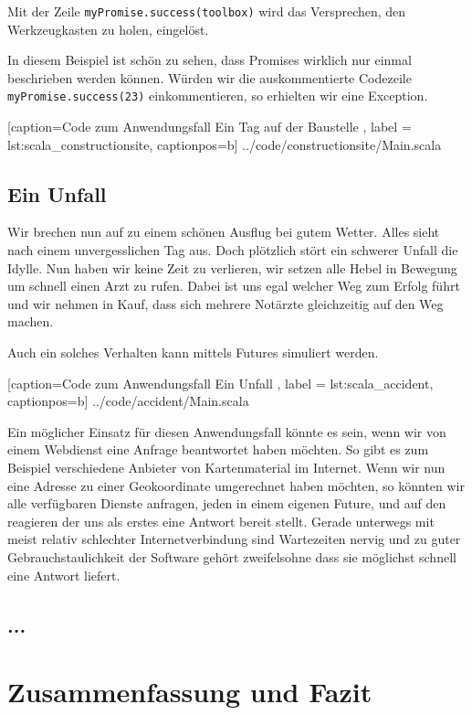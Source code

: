 \documentclass[11pt,a4paper,titlepage,ngerman]{scrartcl}
\begin{document}
Mit der Zeile \texttt{myPromise.success(toolbox)} wird das Versprechen,
den Werkzeugkasten zu holen, eingelöst.

In diesem Beispiel ist schön zu sehen, dass Promises wirklich nur einmal
beschrieben werden können. Würden wir die auskommentierte Codezeile
\texttt{myPromise.success(23)} einkommentieren, so erhielten wir eine
Exception.


    [caption={Code zum Anwendungsfall \glqq Ein Tag auf der Baustelle\grqq{} },
       label = lst:scala_constructionsite,
       captionpos=b]
 {../code/constructionsite/Main.scala}

\subsection{Ein Unfall}

Wir brechen nun auf zu einem schönen Ausflug bei gutem Wetter. Alles sieht
nach einem unvergesslichen Tag aus. Doch plötzlich stört ein schwerer Unfall
die Idylle. Nun haben wir keine Zeit zu verlieren, wir setzen alle Hebel in
Bewegung um schnell einen Arzt zu rufen. Dabei ist uns egal welcher
Weg zum Erfolg führt und wir nehmen in Kauf, dass sich mehrere Notärzte gleichzeitig
auf den Weg machen.

Auch ein solches Verhalten kann mittels Futures simuliert werden.


    [caption={Code zum Anwendungsfall \glqq Ein Unfall\grqq{} },
       label = lst:scala_accident,
       captionpos=b]
 {../code/accident/Main.scala}
 
Ein möglicher Einsatz für diesen Anwendungsfall könnte es sein, wenn wir von
einem Webdienst eine Anfrage beantwortet haben möchten. So gibt es zum Beispiel
verschiedene Anbieter von Kartenmaterial im Internet. Wenn wir nun eine Adresse
zu einer Geokoordinate umgerechnet haben möchten, so könnten wir alle verfügbaren
Dienste anfragen, jeden in einem eigenen Future, und auf den reagieren der uns
als erstes eine Antwort bereit stellt. Gerade unterwegs mit meist relativ schlechter
Internetverbindung sind Wartezeiten nervig und zu guter Gebrauchstaulichkeit der
Software gehört zweifelsohne dass sie möglichst schnell eine Antwort liefert.

\subsection{...}

\newpage
\section{Zusammenfassung und Fazit}
\end{document}
